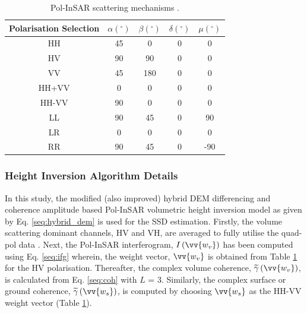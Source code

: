\documentclass[review]{elsarticle}
\numberwithin{equation}{section}
\numberwithin{figure}{section}
\numberwithin{table}{section}
\begin{document}
\begin{table}[ht]
\centering
\caption{Pol-InSAR scattering mechanisms \citep{Cloude2005}.}
\label{table:1}
\begin{tabular}{c c c c c}
\hline
\textbf{Polarisation Selection} & \boldmath$\alpha(^\circ)$   & \boldmath$\beta(^\circ)$     & \boldmath$\delta(^\circ)$ & \boldmath$\mu(^\circ)$       \\ \hline
HH                     & 45 & 0   & 0          & 0   \\ 
HV                     & 90 & 90  & 0          & 0   \\ 
VV                     & 45 & 180 & 0          & 0   \\ 
HH+VV                  & 0  & 0   & 0          & 0   \\ 
HH-VV                  & 90 & 0   & 0          & 0   \\ 
LL                     & 90 & 45  & 0          & 90  \\ 
LR                     & 0  & 0   & 0           & 0   \\ 
RR                     & 90 & 45  & 0          & -90 \\ \hline
\end{tabular}
\end{table}

\subsubsection{Height Inversion Algorithm Details}
In this study, the modified (also improved) hybrid DEM differencing and coherence amplitude based Pol-InSAR volumetric height inversion model as given by Eq. \eqref{seq:hybrid_dem} is used for the SSD estimation. Firstly, the volume scattering dominant channels, HV and VH, are averaged to fully utilise the quad-pol data \citep{Cloude2005}. Next, the Pol-InSAR interferogram, $I\left(\vv{w_v}\right)$ has been computed using Eq. \eqref{seq:ifg} wherein, the weight vector, $\vv{w_v}$ is obtained from Table \ref{table:1} for the HV polarisation. Thereafter, the complex volume coherence, $\widetilde{\gamma}\left(\vv{w_v}\right)$, is calculated from Eq. \eqref{seq:coh} with $L$ = 3. Similarly, the complex surface or ground coherence, $\widetilde{\gamma}\left(\vv{w_s}\right)$, is computed by choosing $\vv{w_s}$ as the HH-VV weight vector (Table \ref{table:1}).  
\end{document}
